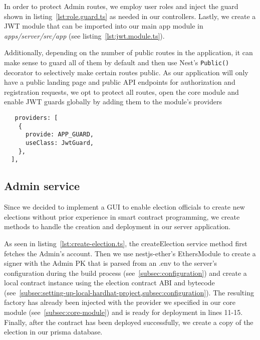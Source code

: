 In order to protect \gls{Admin} routes, we employ user roles and inject the guard shown in listing~\ref{lst:role.guard.ts} as needed in our controllers.
Lastly, we create a \gls{JWT} module that can be imported into our main app module in \emph{apps/server/src/app} (see listing~\ref{lst:jwt.module.ts}).


Additionally, depending on the number of public routes in the application, it can make sense to guard all of them by default and then use Nest's \texttt{Public()} decorator to selectively make certain routes public.
As our application will only have a public landing page and public \gls{API} endpoints for authorization and registration requests, we opt to protect all routes, open the core module and enable \gls{JWT} guards globally by adding them to the module's providers

\begin{verbatim}
   providers: [
    {
      provide: APP_GUARD,
      useClass: JwtGuard,
    },
  ],
\end{verbatim}

\subsection{Admin service}\label{subsec:admin-service}

Since we decided to implement a \gls{GUI} to enable election officials to create new elections without prior experience in smart contract programming, we create methods to handle the creation and deployment in our server application.

As seen in listing~\ref{lst:create-election.ts}, the createElection service method first fetches the \gls{Admin}'s account.
Then we use nestjs-ether's EthersModule to create a signer with the \gls{Admin} \gls{PK} that is parsed from an .env to the server's configuration during the build process (see~\cref{subsec:configuration}) and create a local contract instance using the election contract \gls{ABI} and bytecode (see~\cref{subsec:setting-up-local-hardhat-project,subsec:configuration}).
The resulting factory has already been injected with the provider we specified in our core module (see~\cref{subsec:core-module}) and is ready for deployment in lines 11-15.
Finally, after the contract has been deployed successfully, we create a copy of the election in our prisma database.

